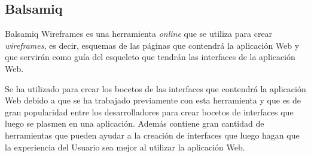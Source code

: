 \subsection{Balsamiq}
Balsamiq Wireframes \cite{balsamiq} es una herramienta \textit{online} que se utiliza para crear \textit{wireframes}, es decir, esquemas de las páginas que contendrá la aplicación Web y que servirán como guía del esqueleto que tendrán las interfaces de la aplicación Web.

Se ha utilizado para crear los bocetos de las interfaces que contendrá la aplicación Web debido a que se ha trabajado previamente con esta herramienta y que es de gran popularidad entre los desarrolladores para crear bocetos de interfaces que luego se plasmen en una aplicación. Además contiene gran cantidad de herramientas que pueden ayudar a la creación de interfaces que luego hagan que la experiencia del Usuario sea mejor al utilizar la aplicación Web. 







